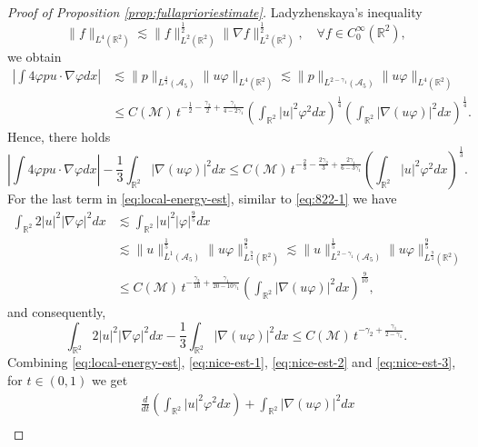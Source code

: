 \documentclass[12pt,reqno]{amsart}
\theoremstyle{plain}
\theoremstyle{definition}
\newcommand{\R}{\mathbb{R}}
\newcommand{\M}{\mathcal{M}}
\newcommand{\A}{\mathcal{A}}
\renewcommand{\:}{\colon}
\numberwithin{equation}{section}
\numberwithin{figure}{section}
\begin{document}
\begin{proof}[Proof of Proposition \ref{prop:fullaprioriestimate}]
 Ladyzhenskaya's inequality 
\begin{equation*}
    \|f\|_{L^4(\R^2)} \lesssim \|f\|_{L^2(\R^2)}^\frac12 \|\nabla f\|_{L^2(\R^2)}^\frac12, \quad \forall f \in C_0^\infty(\R^2),
\end{equation*}
we obtain
\begin{align}
    \left|\int 4\varphi p u \cdot \nabla \varphi dx \right|  &\lesssim \|p\|_{L^{\frac43}(\A_5)} \|u\varphi\|_{L^4(\R^2)} \lesssim \|p\|_{L^{2-\gamma_1}(\A_5)} \|u\varphi\|_{L^4(\R^2)} \nonumber \\
    &\le C(\M) \, t^{-\frac{1}{2}-\frac{\gamma_2}{2} + \frac{{\gamma_1}}{4-2{\gamma_1}}}  \left(\int_{\R^2} |u|^2 \varphi^2 dx\right)^{\frac14} \left(\int_{\R^2} |\nabla (u \varphi)|^2 dx\right)^{\frac14}. \nonumber 
\end{align}
Hence, there holds
\begin{equation} \label{eq:nice-est-2}
	\left|\int 4\varphi p u \cdot \nabla \varphi dx \right| - \frac{1}{3} \int_{\R^2} |\nabla (u \varphi)|^2 dx \le C(\M) \,  t^{-\frac{2}{3}-\frac{2\gamma_2}{3} + \frac{2\gamma_1}{6-3\gamma_1}} \left(\int_{\R^2} |u|^2\varphi^2 dx\right)^\frac13.
\end{equation}
For the last term in \eqref{eq:local-energy-est}, similar to \eqref{eq:822-1} we have
\begin{align}
     \int_{\R^2} 2|u|^2 |\nabla \varphi|^2 dx & \lesssim \int_{\R^2} |u|^2 |\varphi|^{\frac{9}{5}} dx \nonumber \\
    & \lesssim \|u\|_{L^1(\A_5)}^{\frac{1}{5}} \|u \varphi\|_{L^{\frac{9}{4}}(\R^2)}^{\frac{9}{5}} \lesssim \|u\|_{L^{2-\gamma_1}(\A_5)}^{\frac{1}{5}} \|u \varphi\|_{L^{\frac{9}{4}}(\R^2)}^{\frac{9}{5}}  \nonumber \\ 
    & \le C(\M) \, t^{ - \frac{{\gamma_2}}{10} + \frac{{\gamma_1}}{20-10{\gamma_1}}} \left(  \int_{\R^2} |\nabla (u \varphi)|^2 dx\right)^{\frac{9}{10}},
\end{align}
and consequently,
\begin{equation} \label{eq:nice-est-3}
	\int_{\R^2} 2|u|^2 |\nabla \varphi|^2 dx - \frac{1}{3} \int_{\R^2} |\nabla (u \varphi)|^2 dx \le C(\M) \,  t^{ -\gamma_2 + \frac{{\gamma_1}}{2-\gamma_1}}.
\end{equation}
Combining \eqref{eq:local-energy-est}, \eqref{eq:nice-est-1}, \eqref{eq:nice-est-2} and \eqref{eq:nice-est-3}, for $t \in (0,1)$ we get
\begin{align}
    &\quad \frac{d}{dt} \left(\int_{\R^2} |u|^2\varphi^2 dx\right) + \int_{\R^2} |\nabla (u \varphi)|^2 dx \nonumber \\

\end{align}
\end{proof}
\end{document}

